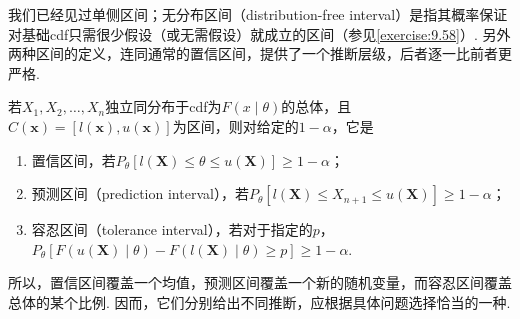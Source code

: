 我们已经见过单侧区间；无分布区间（distribution-free interval）是指其概率保证对基础cdf只需很少假设（或无需假设）就成立的区间（参见\autoref{exercise:9.58}）. 另外两种区间的定义，连同通常的置信区间，提供了一个推断层级，后者逐一比前者更严格.

若$X_1,X_2,\ldots,X_n$独立同分布于cdf为$F(x\mid\theta)$的总体，且$C(\boldsymbol x)=[l(\boldsymbol x),u(\boldsymbol x)]$为区间，则对给定的$1-\alpha$，它是
\begin{enumerate}[label=\roman*.]
\item 置信区间，若$P_\theta[l(\boldsymbol X)\le\theta\le u(\boldsymbol X)]\ge1-\alpha$；
\item 预测区间（prediction interval），若$P_\theta[l(\boldsymbol X)\le X_{n+1}\le u(\boldsymbol X)]\ge1-\alpha$；
\item 容忍区间（tolerance interval），若对于指定的$p$，$P_\theta[F(u(\boldsymbol X)\mid\theta)-F(l(\boldsymbol X)\mid\theta)\ge p]\ge1-\alpha$.
\end{enumerate}
所以，置信区间覆盖一个均值，预测区间覆盖一个新的随机变量，而容忍区间覆盖总体的某个比例. 因而，它们分别给出不同推断，应根据具体问题选择恰当的一种.
